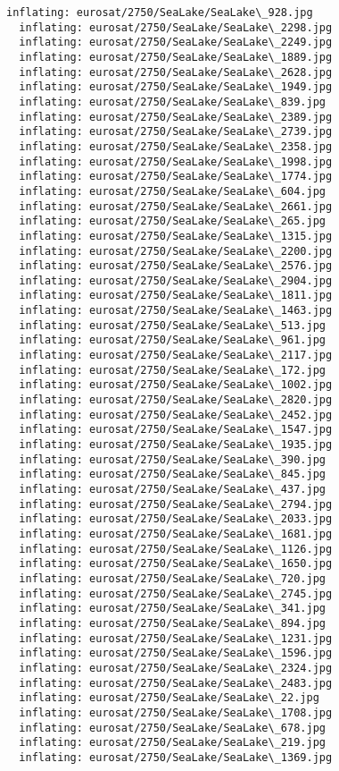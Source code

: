 \documentclass[11pt]{article}
\begin{document}
\begin{Verbatim}[commandchars=\\\{\}]
  inflating: eurosat/2750/SeaLake/SeaLake\_928.jpg
  inflating: eurosat/2750/SeaLake/SeaLake\_2298.jpg
  inflating: eurosat/2750/SeaLake/SeaLake\_2249.jpg
  inflating: eurosat/2750/SeaLake/SeaLake\_1889.jpg
  inflating: eurosat/2750/SeaLake/SeaLake\_2628.jpg
  inflating: eurosat/2750/SeaLake/SeaLake\_1949.jpg
  inflating: eurosat/2750/SeaLake/SeaLake\_839.jpg
  inflating: eurosat/2750/SeaLake/SeaLake\_2389.jpg
  inflating: eurosat/2750/SeaLake/SeaLake\_2739.jpg
  inflating: eurosat/2750/SeaLake/SeaLake\_2358.jpg
  inflating: eurosat/2750/SeaLake/SeaLake\_1998.jpg
  inflating: eurosat/2750/SeaLake/SeaLake\_1774.jpg
  inflating: eurosat/2750/SeaLake/SeaLake\_604.jpg
  inflating: eurosat/2750/SeaLake/SeaLake\_2661.jpg
  inflating: eurosat/2750/SeaLake/SeaLake\_265.jpg
  inflating: eurosat/2750/SeaLake/SeaLake\_1315.jpg
  inflating: eurosat/2750/SeaLake/SeaLake\_2200.jpg
  inflating: eurosat/2750/SeaLake/SeaLake\_2576.jpg
  inflating: eurosat/2750/SeaLake/SeaLake\_2904.jpg
  inflating: eurosat/2750/SeaLake/SeaLake\_1811.jpg
  inflating: eurosat/2750/SeaLake/SeaLake\_1463.jpg
  inflating: eurosat/2750/SeaLake/SeaLake\_513.jpg
  inflating: eurosat/2750/SeaLake/SeaLake\_961.jpg
  inflating: eurosat/2750/SeaLake/SeaLake\_2117.jpg
  inflating: eurosat/2750/SeaLake/SeaLake\_172.jpg
  inflating: eurosat/2750/SeaLake/SeaLake\_1002.jpg
  inflating: eurosat/2750/SeaLake/SeaLake\_2820.jpg
  inflating: eurosat/2750/SeaLake/SeaLake\_2452.jpg
  inflating: eurosat/2750/SeaLake/SeaLake\_1547.jpg
  inflating: eurosat/2750/SeaLake/SeaLake\_1935.jpg
  inflating: eurosat/2750/SeaLake/SeaLake\_390.jpg
  inflating: eurosat/2750/SeaLake/SeaLake\_845.jpg
  inflating: eurosat/2750/SeaLake/SeaLake\_437.jpg
  inflating: eurosat/2750/SeaLake/SeaLake\_2794.jpg
  inflating: eurosat/2750/SeaLake/SeaLake\_2033.jpg
  inflating: eurosat/2750/SeaLake/SeaLake\_1681.jpg
  inflating: eurosat/2750/SeaLake/SeaLake\_1126.jpg
  inflating: eurosat/2750/SeaLake/SeaLake\_1650.jpg
  inflating: eurosat/2750/SeaLake/SeaLake\_720.jpg
  inflating: eurosat/2750/SeaLake/SeaLake\_2745.jpg
  inflating: eurosat/2750/SeaLake/SeaLake\_341.jpg
  inflating: eurosat/2750/SeaLake/SeaLake\_894.jpg
  inflating: eurosat/2750/SeaLake/SeaLake\_1231.jpg
  inflating: eurosat/2750/SeaLake/SeaLake\_1596.jpg
  inflating: eurosat/2750/SeaLake/SeaLake\_2324.jpg
  inflating: eurosat/2750/SeaLake/SeaLake\_2483.jpg
  inflating: eurosat/2750/SeaLake/SeaLake\_22.jpg
  inflating: eurosat/2750/SeaLake/SeaLake\_1708.jpg
  inflating: eurosat/2750/SeaLake/SeaLake\_678.jpg
  inflating: eurosat/2750/SeaLake/SeaLake\_219.jpg
  inflating: eurosat/2750/SeaLake/SeaLake\_1369.jpg

\end{Verbatim}
\end{document}
